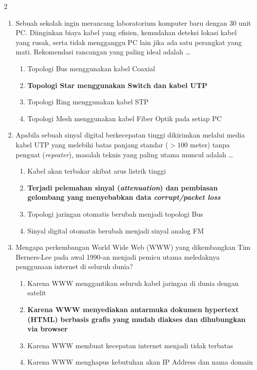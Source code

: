 \documentclass[10pt,a4paper]{article}
\begin{document}
\begin{multicols}{2}
\begin{enumerate}
    \item Sebuah sekolah ingin merancang laboratorium komputer baru dengan 30 unit PC. Diinginkan biaya kabel yang efisien, kemudahan deteksi lokasi kabel yang rusak, serta tidak mengganggu PC lain jika ada satu perangkat yang mati. Rekomendasi rancangan yang paling ideal adalah \dots
    \begin{enumerate}
        \item Topologi Bus menggunakan kabel Coaxial
        \item \textbf{Topologi Star menggunakan Switch dan kabel UTP}
        \item Topologi Ring menggunakan kabel STP
        \item Topologi Mesh menggunakan kabel Fiber Optik pada setiap PC
    \end{enumerate}

    \item Apabila sebuah sinyal digital berkecepatan tinggi dikirimkan melalui media kabel UTP yang melebihi batas panjang standar ($> 100$ meter) tanpa penguat (\emph{repeater}), masalah teknis yang paling utama muncul adalah \dots
    \begin{enumerate}
        \item Kabel akan terbakar akibat arus listrik tinggi
        \item \textbf{Terjadi pelemahan sinyal (\emph{attenuation}) dan pembiasan gelombang yang menyebabkan data \emph{corrupt/packet loss}}
        \item Topologi jaringan otomatis berubah menjadi topologi Bus
        \item Sinyal digital otomatis berubah menjadi sinyal analog FM
    \end{enumerate}

    \item Mengapa perkembangan World Wide Web (WWW) yang dikembangkan Tim Berners-Lee pada awal 1990-an menjadi pemicu utama meledaknya penggunaan internet di seluruh dunia?
    \begin{enumerate}
        \item Karena WWW menggantikan seluruh kabel jaringan di dunia dengan satelit
        \item \textbf{Karena WWW menyediakan antarmuka dokumen hypertext (HTML) berbasis grafis yang mudah diakses dan dihubungkan via browser}
        \item Karena WWW membuat kecepatan internet menjadi tidak terbatas
        \item Karena WWW menghapus kebutuhan akan IP Address dan nama domain
    \end{enumerate}


\end{enumerate}
\end{multicols}
\end{document}
